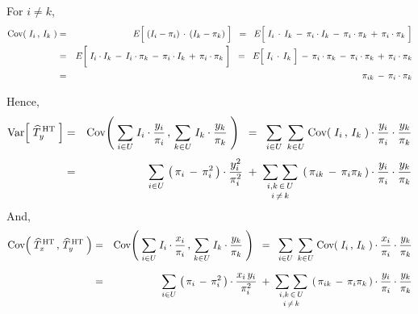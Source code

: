 \noindent
For $i \neq k$,
\begin{eqnarray*}
\Cov\!\left(\;I_{i}\,,\,I_{k}\;\right)
& = &
	E\!\left[\;\left(I_{i}-\pi_{i}\right)\overset{{\color{white}-}}{\cdot}\left(I_{k}-\pi_{k}\right)\;\right]
\;\; = \;\;
	E\!\left[\;
		I_{i} \overset{{\color{white}-}}{\cdot} I_{k}
		\, - \, \pi_{i} \cdot I_{k}
		\, - \, \pi_{i} \cdot \pi_{k}
		\, + \, \pi_{i} \cdot \pi_{k}
		\;\right]
\\
& = &
	E\!\left[\;
		I_{i} \overset{{\color{white}\vert}}{\cdot} I_{k}
		\, - \, I_{i} \cdot \pi_{k}
		\, - \, \pi_{i} \cdot I_{k}
		\, + \, \pi_{i} \cdot \pi_{k}
		\;\right]
\;\; = \;\;
	E\!\left[\; I_{i} \overset{{\color{white}-}}{\cdot} I_{k} \;\right]
		\, - \, \pi_{i} \cdot \pi_{k}
		\, - \, \pi_{i} \cdot \pi_{k}
		\, + \, \pi_{i} \cdot \pi_{k}
\\
& = &
	\pi_{ik} \, - \, \pi_{i} \cdot \pi_{k} 
\end{eqnarray*}

\noindent
Hence,
\begin{eqnarray*}
\Var\!\left[\;\widehat{T}^{\,\textnormal{HT}}_{y}\;\right]
& = &
	\Cov\!\left(\;
		\underset{i \in U}{\sum}\; I_{i}\cdot\dfrac{y_{i}}{\pi_{i}}
		\,,\,
		\underset{k \in U}{\sum}\; I_{k}\cdot\dfrac{y_{k}}{\pi_{k}}
		\;\right)
\;\; = \;\;
	\underset{i \in U}{\sum}\;\,
	\underset{k \in U}{\sum}\;
		\Cov\!\left(\;I_{i}\,,\,I_{k}\;\right)
		\cdot\dfrac{y_{i}}{\pi_{i}}
		\cdot\dfrac{y_{k}}{\pi_{k}}
\\
& = &
	\overset{{\color{white}1}}{\underset{i \in U}{\sum}}\,
		\left(\,\pi_{i}\,-\,\pi_{i}^{2}\,\right) \cdot \dfrac{y_{i}^{2}}{\pi_{i}^{2}}
	\; + \;
	\underset{i \, \neq \, k}{\underset{i , k \,\in\,U}{\sum\,\sum}}\;
		\left(\,\pi_{ik} \, - \, \pi_{i}\pi_{k}\,\right)
		\cdot\dfrac{y_{i}}{\pi_{i}}
		\cdot\dfrac{y_{k}}{\pi_{k}}
\end{eqnarray*}
And,
\begin{eqnarray*}
\Cov\!\left(\;
	\widehat{T}^{\,\textnormal{HT}}_{x}
	\,,\,
	\widehat{T}^{\,\textnormal{HT}}_{y}
	\;\right)
& = &
	\Cov\!\left(\;
		\underset{i \in U}{\sum}\; I_{i}\cdot\dfrac{x_{i}}{\pi_{i}}
		\,,\,
		\underset{k \in U}{\sum}\; I_{k}\cdot\dfrac{y_{k}}{\pi_{k}}
		\;\right)
\;\; = \;\;
	\underset{i \in U}{\sum}\;\,
	\underset{k \in U}{\sum}\;
		\Cov\!\left(\;I_{i}\,,\,I_{k}\;\right)
		\cdot\dfrac{x_{i}}{\pi_{i}}
		\cdot\dfrac{y_{k}}{\pi_{k}}
\\
& = &
	\overset{{\color{white}1}}{\underset{i \in U}{\sum}}\,
		\left(\,\pi_{i}\,-\,\pi_{i}^{2}\,\right) \cdot \dfrac{x_{i}\,y_{i}}{\pi_{i}^{2}}
	\; + \;
	\underset{i \, \neq \, k}{\underset{i , k \,\in\,U}{\sum\,\sum}}\;
		\left(\,\pi_{ik} \, - \, \pi_{i}\pi_{k}\,\right)
		\cdot\dfrac{y_{i}}{\pi_{i}}
		\cdot\dfrac{y_{k}}{\pi_{k}}
\end{eqnarray*}

